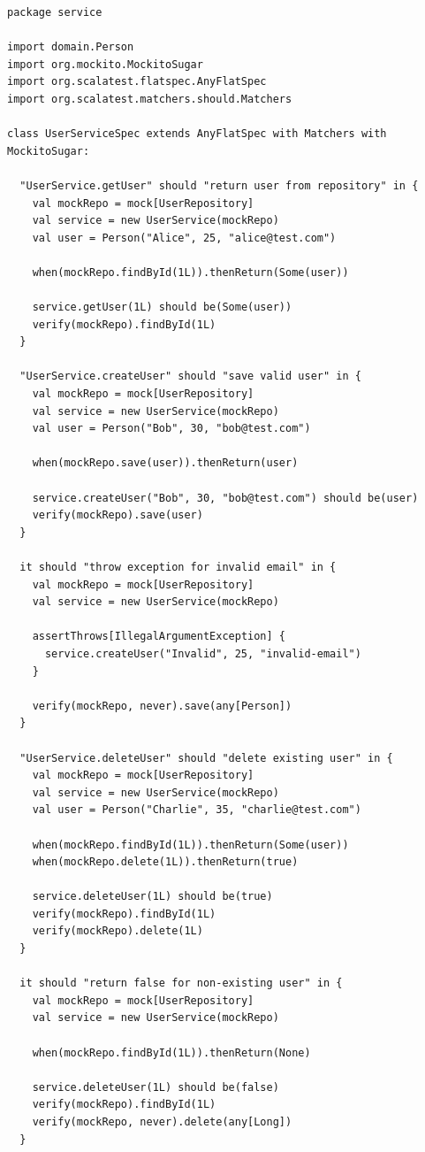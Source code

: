 \documentclass[12pt,a4paper]{article}
\begin{document}
\begin{lstlisting}
package service

import domain.Person
import org.mockito.MockitoSugar
import org.scalatest.flatspec.AnyFlatSpec
import org.scalatest.matchers.should.Matchers

class UserServiceSpec extends AnyFlatSpec with Matchers with MockitoSugar:
  
  "UserService.getUser" should "return user from repository" in {
    val mockRepo = mock[UserRepository]
    val service = new UserService(mockRepo)
    val user = Person("Alice", 25, "alice@test.com")
    
    when(mockRepo.findById(1L)).thenReturn(Some(user))
    
    service.getUser(1L) should be(Some(user))
    verify(mockRepo).findById(1L)
  }
  
  "UserService.createUser" should "save valid user" in {
    val mockRepo = mock[UserRepository]
    val service = new UserService(mockRepo)
    val user = Person("Bob", 30, "bob@test.com")
    
    when(mockRepo.save(user)).thenReturn(user)
    
    service.createUser("Bob", 30, "bob@test.com") should be(user)
    verify(mockRepo).save(user)
  }
  
  it should "throw exception for invalid email" in {
    val mockRepo = mock[UserRepository]
    val service = new UserService(mockRepo)
    
    assertThrows[IllegalArgumentException] {
      service.createUser("Invalid", 25, "invalid-email")
    }
    
    verify(mockRepo, never).save(any[Person])
  }
  
  "UserService.deleteUser" should "delete existing user" in {
    val mockRepo = mock[UserRepository]
    val service = new UserService(mockRepo)
    val user = Person("Charlie", 35, "charlie@test.com")
    
    when(mockRepo.findById(1L)).thenReturn(Some(user))
    when(mockRepo.delete(1L)).thenReturn(true)
    
    service.deleteUser(1L) should be(true)
    verify(mockRepo).findById(1L)
    verify(mockRepo).delete(1L)
  }
  
  it should "return false for non-existing user" in {
    val mockRepo = mock[UserRepository]
    val service = new UserService(mockRepo)
    
    when(mockRepo.findById(1L)).thenReturn(None)
    
    service.deleteUser(1L) should be(false)
    verify(mockRepo).findById(1L)
    verify(mockRepo, never).delete(any[Long])
  }
\end{lstlisting}
\end{document}
